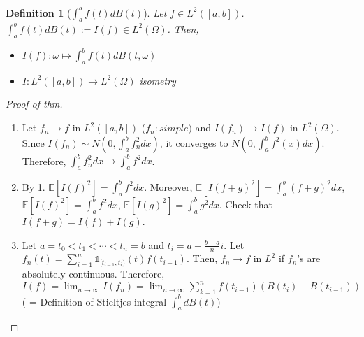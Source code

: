\documentclass[12pt]{report}
\newcommand{\E}{\mathbb{E}}
\renewcommand{\1}{\mathbb{1}}
\renewcommand{\O}{\Omega}
\theoremstyle{break}
\theoremstyle{newdef}
\newtheorem{defn}[thm]{Definition} %
\theoremstyle{remark}
\begin{document}
\begin{defn}[$\int_a^b f(t)dB(t)$]
Let $f \in L^2([a,b])$. $\int_a^b f(t)dB(t) := I(f)\in L^2(\O)$. Then,
\begin{itemize}
\item $I(f) : \omega \mapsto \int_a^b f(t)dB(t,\omega)$
\item $I: L^2([a,b]) \rightarrow L^2(\O)$ isometry
\end{itemize}
\end{defn}

\begin{proof}[Proof of thm]
\leavevmode
\begin{enumerate}
\item
Let $f_n \rightarrow f$ in $L^2([a,b])$ ($f_n: simple)$ and $I(f_n) \rightarrow I(f)$ in $L^2(\O)$.
Since $I(f_n) \sim N(0, \int_a^b f_n^2 dx)$, it converges to $N(0,\int_a^b f^2(x)dx)$.
Therefore, $\int_a^b f_n^2dx \rightarrow \int_a^b f^2dx$.

\item By 1. $\E[I(f)^2] = \int_a^b f^2dx$. Moreover,
$\E[I(f+g)^2] = \int_a^b (f+g)^2 dx$,
$\E[I(f)^2] = \int_a^b f^2 dx$,
$\E[I(g)^2] = \int_a^b g^2 dx$.
Check that $I(f+g) = I(f)+I(g)$.

\item Let $a = t_0 < t_1 < \cdots < t_n = b$ and $t_i = a + \frac{b-a}{n}i$.
Let $f_n(t) = \sum_{i=1}^n \1_{[t_{i-1}, t_i)}(t) f(t_{i-1})$.
Then, $f_n \rightarrow f$ in $L^2$ if $f_n$'s are absolutely continuous.
Therefore, $I(f) = \lim_{n\rightarrow\infty} I(f_n) = \lim_{n\rightarrow\infty} \sum_{k=1}^n f(t_{i-1})(B(t_i)-B(t_{i-1}))$ ( = Definition of Stieltjes integral $\int_a^b dB(t)$)
\end{enumerate}
\end{proof}



















\end{document}
